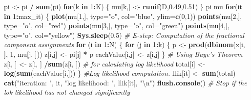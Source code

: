 \documentclass[]{article}
\newenvironment{Shaded}{\begin{snugshade}}{\end{snugshade}}
\newcommand{\KeywordTok}[1]{\textcolor[rgb]{0.13,0.29,0.53}{\textbf{#1}}}
\newcommand{\DataTypeTok}[1]{\textcolor[rgb]{0.13,0.29,0.53}{#1}}
\newcommand{\DecValTok}[1]{\textcolor[rgb]{0.00,0.00,0.81}{#1}}
\newcommand{\FloatTok}[1]{\textcolor[rgb]{0.00,0.00,0.81}{#1}}
\newcommand{\CharTok}[1]{\textcolor[rgb]{0.31,0.60,0.02}{#1}}
\newcommand{\StringTok}[1]{\textcolor[rgb]{0.31,0.60,0.02}{#1}}
\newcommand{\CommentTok}[1]{\textcolor[rgb]{0.56,0.35,0.01}{\textit{#1}}}
\newcommand{\ControlFlowTok}[1]{\textcolor[rgb]{0.13,0.29,0.53}{\textbf{#1}}}
\newcommand{\OperatorTok}[1]{\textcolor[rgb]{0.81,0.36,0.00}{\textbf{#1}}}
\newcommand{\NormalTok}[1]{#1}
\begin{document}
\begin{Shaded}
\begin{Highlighting}[]
{{\NormalTok{pi <-}\StringTok{ }\NormalTok{pi }\OperatorTok{/}\StringTok{ }\KeywordTok{sum}\NormalTok{(pi)}
\ControlFlowTok{for}\NormalTok{(k }\ControlFlowTok{in} \DecValTok{1}\OperatorTok{:}\NormalTok{K) \{}
\NormalTok{mu[k,] <-}\StringTok{ }\KeywordTok{runif}\NormalTok{(D,}\FloatTok{0.49}\NormalTok{,}\FloatTok{0.51}\NormalTok{)}
\NormalTok{\}}
\NormalTok{pi}
\NormalTok{mu}
\ControlFlowTok{for}\NormalTok{(it }\ControlFlowTok{in} \DecValTok{1}\OperatorTok{:}\NormalTok{max_it) \{}
\KeywordTok{plot}\NormalTok{(mu[}\DecValTok{1}\NormalTok{,], }\DataTypeTok{type=}\StringTok{"o"}\NormalTok{, }\DataTypeTok{col=}\StringTok{"blue"}\NormalTok{, }\DataTypeTok{ylim=}\KeywordTok{c}\NormalTok{(}\DecValTok{0}\NormalTok{,}\DecValTok{1}\NormalTok{))}
\KeywordTok{points}\NormalTok{(mu[}\DecValTok{2}\NormalTok{,], }\DataTypeTok{type=}\StringTok{"o"}\NormalTok{, }\DataTypeTok{col=}\StringTok{"red"}\NormalTok{)}
\KeywordTok{points}\NormalTok{(mu[}\DecValTok{3}\NormalTok{,], }\DataTypeTok{type=}\StringTok{"o"}\NormalTok{, }\DataTypeTok{col=}\StringTok{"green"}\NormalTok{)}
\KeywordTok{points}\NormalTok{(mu[}\DecValTok{4}\NormalTok{,], }\DataTypeTok{type=}\StringTok{"o"}\NormalTok{, }\DataTypeTok{col=}\StringTok{"yellow"}\NormalTok{)}
\KeywordTok{Sys.sleep}\NormalTok{(}\FloatTok{0.5}\NormalTok{)}
\CommentTok{# E-step: Computation of the fractional component assignments}
\ControlFlowTok{for}\NormalTok{ (i }\ControlFlowTok{in} \DecValTok{1}\OperatorTok{:}\NormalTok{N) \{}
\ControlFlowTok{for}\NormalTok{ (j }\ControlFlowTok{in} \DecValTok{1}\OperatorTok{:}\NormalTok{k) \{}
\NormalTok{p <-}\StringTok{ }\KeywordTok{prod}\NormalTok{(}\KeywordTok{dbinom}\NormalTok{(x[i, ], }\DecValTok{1}\NormalTok{, mu[j, ]))}
\NormalTok{z[i,j] <-}\StringTok{ }\NormalTok{pi[j] }\OperatorTok{*}\StringTok{ }\NormalTok{p}
\NormalTok{eachValue[i,j] <-}\StringTok{ }\NormalTok{z[i,j]}
\NormalTok{\}}
\CommentTok{# Using Baye's Theorem}
\NormalTok{z[i, ] <-}\StringTok{ }\NormalTok{z[i, ] }\OperatorTok{/}\KeywordTok{sum}\NormalTok{(z[i, ])}
\CommentTok{# for calculating log likelihood}
\NormalTok{total[i] <-}\StringTok{ }\KeywordTok{log}\NormalTok{(}\KeywordTok{sum}\NormalTok{(eachValue[i,]))}
\NormalTok{\}}
\CommentTok{#Log likelihood computation.}
\NormalTok{llik[it] <-}\StringTok{ }\KeywordTok{sum}\NormalTok{(total)}
\KeywordTok{cat}\NormalTok{(}\StringTok{"iteration: "}\NormalTok{, it, }\StringTok{"log likelihood: "}\NormalTok{, llik[it], }\StringTok{"}\CharTok{\textbackslash{}n}\StringTok{"}\NormalTok{)}
\KeywordTok{flush.console}\NormalTok{()}
\CommentTok{# Stop if the lok likelihood has not changed significantly}
}}
\end{Highlighting}
\end{Shaded}
\end{document}

